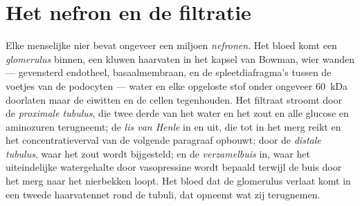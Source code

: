 \section{Het nefron en de filtratie}

\begin{definition}\label{def:b3:renal-osmoregulation:nephron}
Elke menselijke nier bevat ongeveer een miljoen \emph{nefronen}. Het
bloed komt een \emph{glomerulus} binnen, een kluwen haarvaten in het
kapsel van Bowman, wier wanden --- gevensterd endotheel,
basaalmembraan, en de spleetdiafragma's tussen de voetjes van de
podocyten --- water en elke opgeloste stof onder ongeveer \qty{60}{kDa}
doorlaten maar de eiwitten en de cellen tegenhouden. Het filtraat
stroomt door de \emph{proximale tubulus}, die twee derde van het water
en het zout en alle glucose en aminozuren terugneemt; de \emph{lis van
Henle} in en uit, die tot in het merg reikt en het concentratieverval
van de volgende paragraaf opbouwt; door de \emph{distale tubulus}, waar
het zout wordt bijgesteld; en de \emph{verzamelbuis} in, waar het
uiteindelijke watergehalte door vasopressine wordt bepaald terwijl de
buis door het merg naar het nierbekken loopt. Het bloed dat de
glomerulus verlaat komt in een tweede haarvatennet rond de tubuli, dat
opneemt wat zij terugnemen.
\end{definition}

